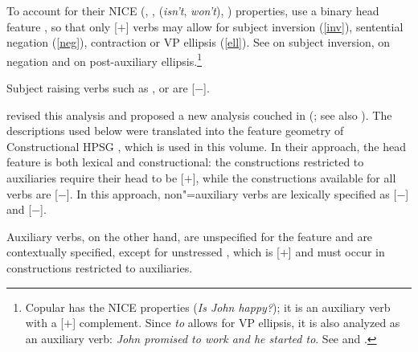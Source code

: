 To account for their NICE (, ,  (\emph{isn't}, \emph{won't}), ) properties, \citet{KS2002a} %
use a binary head feature \aux, so that only [\aux $+$] verbs may allow for subject inversion
(\ref{inv}), sentential negation (\ref{neg}), contraction or VP ellipsis (\ref{ell}). See
 on subject inversion,
 on negation and
 on post-auxiliary ellipsis.\footnote{Copular  has
  the NICE properties (\textit{Is John happy?}); it is an auxiliary verb with a [\prd $+$]
  complement. Since \emph{to} allows for VP ellipsis, it is also analyzed as an auxiliary verb:
  \emph{John promised to work and he started to}. See  and .} 

\eal
{}
\zl

\noindent
Subject raising verbs such as ,  or  are [\aux $-$].

\citet{Sagetal2020} revised this analysis and proposed a new analysis couched in \sbcg (\citealp{Sag2012a}; see also ). The descriptions used below were translated into the feature geometry of Constructional HPSG \citep{Sag97a}, which is used in this volume. In their approach, the head feature \aux is both lexical and constructional: the constructions restricted to auxiliaries require their head to be [\aux $+$], while the constructions available for all verbs are [\aux $-$]. In this approach, non"=auxiliary verbs are lexically specified as [\aux $-$] and [\inv $-$].


 Auxiliary verbs, on the other hand, are unspecified for the feature \aux and are contextually specified, except for unstressed , which is [\aux $+$] and must occur in constructions restricted to auxiliaries.

